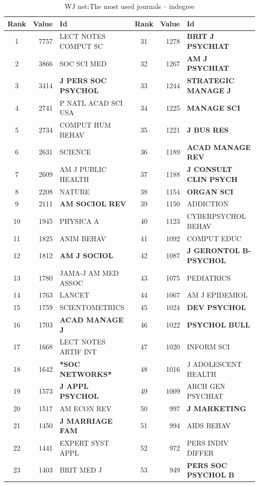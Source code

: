 \documentclass[11pt]{article} %
\begin{document}
\begin{table}
\caption{WJ net:\label{jourind}The most used journals -- indegree}\medskip
\small
\renewcommand{\arraystretch}{0.95}
\begin{tabular}{c|r|l||c|r|l}
Rank&   	Value&   	Id&   	Rank&   	Value&   	Id \\ \hline
1&	7757&	LECT NOTES COMPUT SC&	31&	1278&	\textbf{BRIT J PSYCHIAT}\\
2&	3866&	SOC SCI MED&	32&	1267&\textbf{AM J PSYCHIAT}\\
3&	3414&	\textbf{J PERS SOC PSYCHOL}&	33&	1244&	\textbf{STRATEGIC MANAGE J}\\
4&	2741&	P NATL ACAD SCI USA&	34&	1225&	\textbf{MANAGE SCI}\\
5&	2734&	COMPUT HUM BEHAV&	35&	1221&	\textbf{J BUS RES}\\
6&	2631&	SCIENCE&	36&	1189&\textbf{ACAD MANAGE REV}\\
7&	2609&	AM J PUBLIC HEALTH&	37&	1188&\textbf{J CONSULT CLIN PSYCH}\\
8&	2208&	NATURE&	38&	1154&\textbf{ORGAN SCI}\\
9&	2111&	\textbf{AM SOCIOL REV}&	39&	1150&	ADDICTION\\
10&	1945&	PHYSICA A&	40&	1123&	CYBERPSYCHOL BEHAV\\
11&	1825&	ANIM BEHAV&	41&	1092&	COMPUT EDUC\\
12&	1812&	\textbf{AM J SOCIOL}&	42&	1087&	\textbf{J GERONTOL B-PSYCHOL}\\
13&	1780&	JAMA-J AM MED ASSOC&	43&	1075&	PEDIATRICS\\
14&	1763&	LANCET&	44&	1067&	AM J EPIDEMIOL\\
15&	1759&	SCIENTOMETRICS&	45&	1024&\textbf{DEV PSYCHOL}\\
16&	1703&	\textbf{ACAD MANAGE J}&	46&	1022&\textbf{PSYCHOL BULL}\\
17&	1668&	LECT NOTES ARTIF INT&	47&	1020&	INFORM SCI\\
18&	1642&\textbf{*SOC NETWORKS*}&	48&	1016&	J ADOLESCENT HEALTH\\
19&	1573&\textbf{J APPL PSYCHOL}&	49&	1009&	ARCH GEN PSYCHIAT\\
20&	1517&	AM ECON REV&	50&	997&\textbf{J MARKETING}\\
21&	1450&	\textbf{J MARRIAGE FAM}&	51&	994&	AIDS BEHAV\\
22&	1441&	EXPERT SYST APPL&	52&	972&	PERS INDIV DIFFER\\
23&	1403&	BRIT MED J&	53&	949&\textbf{PERS SOC PSYCHOL B}\\

\end{tabular}
\end{table}
\end{document}
